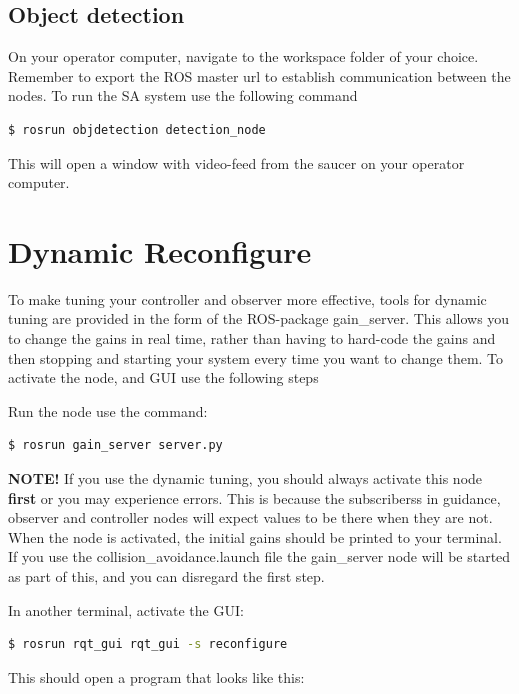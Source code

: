 \subsection{Object detection}

On your operator computer, navigate to the workspace folder of your choice. Remember to export the ROS master url to establish communication between the nodes. To run the SA system use the following command

\begin{lstlisting}[language=bash]
$ rosrun objdetection detection_node
\end{lstlisting}

This will open a window with video-feed from the saucer on your operator computer. 


\section{Dynamic Reconfigure}

To make tuning your controller and observer more effective, tools for dynamic tuning are provided in the form of the ROS-package gain\_server. This allows you to change the gains in real time, rather than having to hard-code the gains and then stopping and starting your system every time you want to change them. To activate the node, and GUI use the following steps

Run the node use the command:
\begin{lstlisting}[language=bash]
$ rosrun gain_server server.py
\end{lstlisting}
\textbf{NOTE!} If you use the dynamic tuning, you should always activate this node \textbf{first} or you may experience errors. This is because the subscriberss in guidance, observer and controller nodes will expect values to be there when they are not. When the node is activated, the initial gains should be printed to your terminal. If you use the collision\_avoidance.launch file the gain\_server node will be started as part of this, and you can disregard the first step. 
    
 In another terminal, activate the GUI: 
\begin{lstlisting}[language=bash]
$ rosrun rqt_gui rqt_gui -s reconfigure
\end{lstlisting}
    
This should open a program that looks like this: 
    
